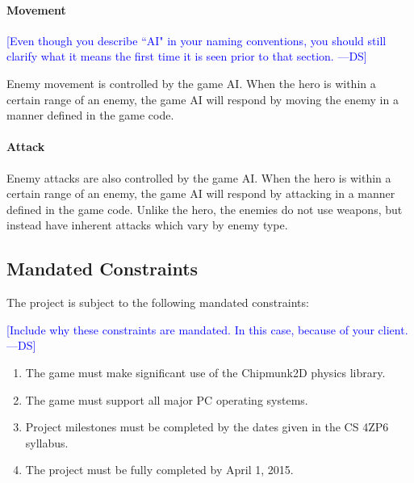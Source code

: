 \documentclass[12pt, titlepage]{article}
\newcommand{\authornote}[3]{\textcolor{#1}{[#3 ---#2]}}
\newcommand{\authornote}[3]{}
\newcommand{\ds}[1]{\authornote{blue}{DS}{#1}}
\begin{document}
\paragraph{Movement}
\ds{Even though you describe ``AI" in your naming conventions, you should still
clarify what it means the first time it is seen prior to that section.}

Enemy movement is controlled by the game AI.  When the hero is within a certain range of an enemy, the game AI will respond by moving the enemy in a manner defined in the game code.

\paragraph{Attack}
Enemy attacks are also controlled by the game AI.  When the hero is within a certain range of an enemy, the game AI will respond by attacking in a manner defined in the game code.  Unlike the hero, the enemies do not use weapons, but instead have inherent attacks which vary by enemy type.



\subsection{Mandated Constraints}

The project is subject to the following mandated constraints:

\ds{Include why these constraints are mandated. In this case, because of your client.}

\begin{enumerate}
  \item The game must make significant use of the Chipmunk2D physics library.
  \item The game must support all major PC operating systems.
  \item Project milestones must be completed by the dates given in the CS 4ZP6 syllabus.
  \item The project must be fully completed by April 1, 2015.
\end{enumerate}
\end{document}
